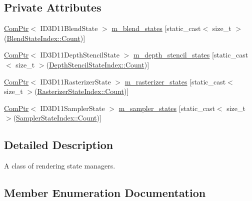 \subsection*{Private Attributes}
\begin{DoxyCompactItemize}
\item 
\hyperlink{namespacemage_ae74f374780900893caa5555d1031fd79}{Com\+Ptr}$<$ I\+D3\+D11\+Blend\+State $>$ \hyperlink{classmage_1_1_rendering_state_manager_ad50dc7c990bf42580e511c55684e6630}{m\+\_\+blend\+\_\+states} \mbox{[}static\+\_\+cast$<$ size\+\_\+t $>$(\hyperlink{classmage_1_1_rendering_state_manager_a499a47606ff73352331177b668c4b64cae93f994f01c537c4e2f7d8528c3eb5e9}{Blend\+State\+Index\+::\+Count})\mbox{]}
\item 
\hyperlink{namespacemage_ae74f374780900893caa5555d1031fd79}{Com\+Ptr}$<$ I\+D3\+D11\+Depth\+Stencil\+State $>$ \hyperlink{classmage_1_1_rendering_state_manager_a8bd01105789b3aac90ee56a0322f98e8}{m\+\_\+depth\+\_\+stencil\+\_\+states} \mbox{[}static\+\_\+cast$<$ size\+\_\+t $>$(\hyperlink{classmage_1_1_rendering_state_manager_a7a8ab9ab2d4eb992a364d09c9eec636aae93f994f01c537c4e2f7d8528c3eb5e9}{Depth\+Stencil\+State\+Index\+::\+Count})\mbox{]}
\item 
\hyperlink{namespacemage_ae74f374780900893caa5555d1031fd79}{Com\+Ptr}$<$ I\+D3\+D11\+Rasterizer\+State $>$ \hyperlink{classmage_1_1_rendering_state_manager_aa9ecd4ca82954b3d457e811bf44d835a}{m\+\_\+rasterizer\+\_\+states} \mbox{[}static\+\_\+cast$<$ size\+\_\+t $>$(\hyperlink{classmage_1_1_rendering_state_manager_a72211dd35c1d3968717147572ca127daae93f994f01c537c4e2f7d8528c3eb5e9}{Rasterizer\+State\+Index\+::\+Count})\mbox{]}
\item 
\hyperlink{namespacemage_ae74f374780900893caa5555d1031fd79}{Com\+Ptr}$<$ I\+D3\+D11\+Sampler\+State $>$ \hyperlink{classmage_1_1_rendering_state_manager_ae486a0cc711b5b02af4364a3f7184ccd}{m\+\_\+sampler\+\_\+states} \mbox{[}static\+\_\+cast$<$ size\+\_\+t $>$(\hyperlink{classmage_1_1_rendering_state_manager_ad756bcfaf65de7ce2a7ac46e0ba97557ae93f994f01c537c4e2f7d8528c3eb5e9}{Sampler\+State\+Index\+::\+Count})\mbox{]}
\end{DoxyCompactItemize}


\subsection{Detailed Description}
A class of rendering state managers. 

\subsection{Member Enumeration Documentation}
\hypertarget{classmage_1_1_rendering_state_manager_a499a47606ff73352331177b668c4b64c}{}\label{classmage_1_1_rendering_state_manager_a499a47606ff73352331177b668c4b64c} 

